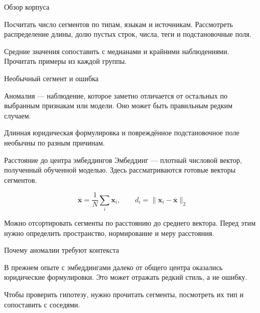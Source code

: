 \documentclass[aspectratio=169,12pt]{beamer}
\begin{document}
\begin{frame}{Обзор корпуса}
\color{ink}
{\small Посчитать число сегментов по типам, языкам и источникам. Рассмотреть распределение длины, долю пустых строк, числа, теги и подстановочные поля.
\par\vspace{0.6em}Средние значения сопоставить с медианами и крайними наблюдениями. Прочитать примеры из каждой группы.}
\end{frame}

\begin{frame}{Необычный сегмент и ошибка}
\color{ink}
{\small Аномалия — наблюдение, которое заметно отличается от остальных по выбранным признакам или модели. Оно может быть правильным редким случаем.
\par\vspace{0.6em}Длинная юридическая формулировка и повреждённое подстановочное поле необычны по разным причинам.}
\end{frame}

\begin{frame}{Расстояние до центра эмбеддингов}
\color{ink}
{\small Эмбеддинг — плотный числовой вектор, полученный обученной моделью. Здесь рассматриваются готовые векторы сегментов.}
{\small \[\displaystyle \overline{\mathbf x}=\frac1N\sum_i\mathbf x_i,\qquad d_i=\|\mathbf x_i-\overline{\mathbf x}\|_2\]
\par\vspace{0.6em}Можно отсортировать сегменты по расстоянию до среднего вектора. Перед этим нужно определить пространство, нормирование и меру расстояния.}
\end{frame}

\begin{frame}{Почему аномалии требуют контекста}
\color{ink}
{\small В прежнем опыте с эмбеддингами далеко от общего центра оказались юридические формулировки. Это может отражать редкий стиль, а не ошибку.
\par\vspace{0.6em}Чтобы проверить гипотезу, нужно прочитать сегменты, посмотреть их тип и сопоставить с соседями.}
\end{frame}
\end{document}
